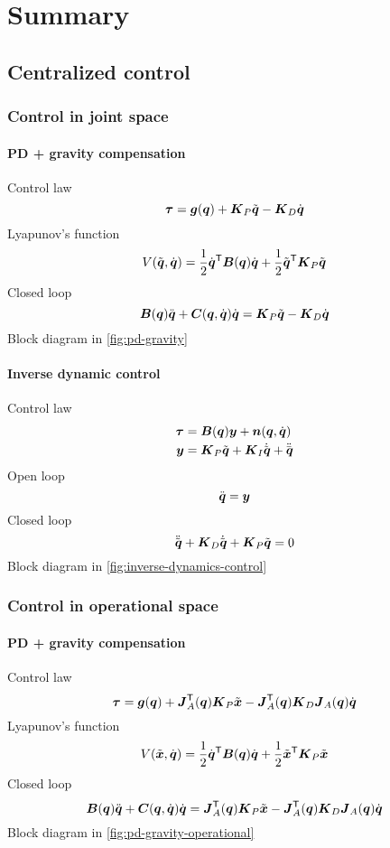 \chapter{Summary}\label{ch:summary}

\section{Centralized control}

\subsection{Control in joint space}

\subsubsection{PD + gravity compensation}

Control law
\[
	\vect \tau = \vect g(\q) + \matr K_P \tilde \q - \matr K_D\dq
\]
Lyapunov's function
\[
	V(\qe, \dq) = \frac{1}{2} \dq^\trans \matr B(\q) \dq + \frac{1}{2} \qe^\trans \matr K_P \qe
\]
Closed loop
\[
	\matr{B}(\q)\ddq + \matr{C}(\q,\dq)\dq = \matr K_P \tilde \q - \matr K_D\dq
\]
Block diagram in \autoref{fig:pd-gravity}

\subsubsection{Inverse dynamic control}

Control law
\begin{align*}
	\vect \tau &= \B(\q)\y + \n(\q,\dq) \\
	\y &= \matr K_P \qe + \matr K_I \dqe + \ddqd
\end{align*}
Open loop
\[
	\ddq = \vect y
\]
Closed loop
\[
	\ddqe + \matr K_D \dqe + \matr K_P \qe = 0
\]
Block diagram in \autoref{fig:inverse-dynamics-control}

\subsection{Control in operational space}

\subsubsection{PD + gravity compensation}

Control law
\[
	\vect\tau = \g(\q) + \J_A^\trans(\q) \K_P \xe - \J_A^\trans(\q) \K_D \J_A(\q) \dq
\]
Lyapunov's function
\[
	V(\xe,\dq) = \frac{1}{2} \dq^\trans\B(\q)\dq + \frac{1}{2}\xe^\trans \K_P \xe
\]
Closed loop
\[
	\B(\q)\ddq + \C(\q,\dq)\dq = \J_A^\trans(\q) \K_P \xe - \J_A^\trans(\q) \K_D \J_A(\q) \dq
\]
Block diagram in \autoref{fig:pd-gravity-operational}

